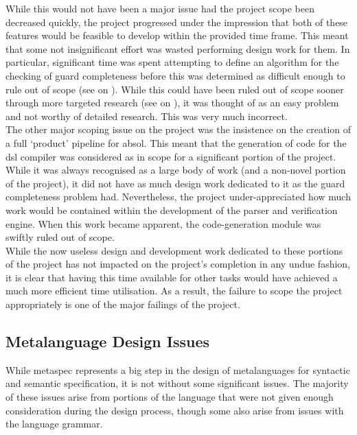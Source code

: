 While this would not have been a major issue had the project scope been decreased quickly, the project progressed under the impression that both of these features would be feasible to develop within the provided time frame.
This meant that some not insignificant effort was wasted performing design work for them. 
In particular, significant time was spent attempting to define an algorithm for the checking of guard completeness before this was determined as difficult enough to rule out of scope (see  on ).
While this could have been ruled out of scope sooner through more targeted research (see  on ), it was thought of as an easy problem and not worthy of detailed research. 
This was very much incorrect.\\

The other major scoping issue on the project was the insistence on the creation of a full `product' pipeline for \gls{absol}.
This meant that the generation of code for the \gls{dsl} compiler was considered as in scope for a significant portion of the project.
While it was always recognised as a large body of work (and a non-novel portion of the project), it did not have as much design work dedicated to it as the guard completeness problem had.
Nevertheless, the project under-appreciated how much work would be contained within the development of the parser and verification engine.
When this work became apparent, the code-generation module was swiftly ruled out of scope. \\

While the now useless design and development work dedicated to these portions of the project has not impacted on the project's completion in any undue fashion, it is clear that having this time available for other tasks would have achieved a much more efficient time utilisation.
As a result, the failure to scope the project appropriately is one of the major failings of the project.


\subsection{Metalanguage Design Issues} %
\label{sub:metalanguage_design_issues}
While \gls{metaspec} represents a big step in the design of metalanguages for syntactic and semantic specification, it is not without some significant issues.
The majority of these issues arise from portions of the language that were not given enough consideration during the design process, though some also arise from issues with the language grammar. 

